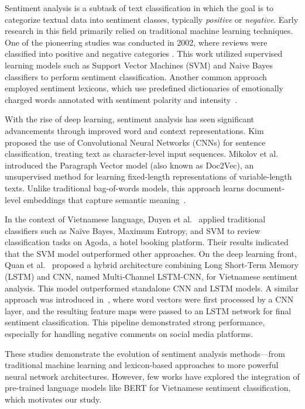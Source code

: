 \documentclass[11pt]{article}
\begin{document}
Sentiment analysis is a subtask of text classification in which the goal is to categorize textual data into sentiment classes, typically \textit{positive} or \textit{negative}. Early research in this field primarily relied on traditional machine learning techniques. One of the pioneering studies was conducted in 2002, where reviews were classified into positive and negative categories \cite{pang-etal-2002-thumbs}. This work utilized supervised learning models such as Support Vector Machines (SVM) \cite{article} and Naive Bayes classifiers \cite{dey2016sentiment} to perform sentiment classification. Another common approach employed sentiment lexicons, which use predefined dictionaries of emotionally charged words annotated with sentiment polarity and intensity~\cite{taboada2011lexicon}.

With the rise of deep learning, sentiment analysis has seen significant advancements through improved word and context representations. Kim~\cite{kim2014convolutional} proposed the use of Convolutional Neural Networks (CNNs) for sentence classification, treating text as character-level input sequences. Mikolov et al.~\cite{mikolov2013distributed} introduced the Paragraph Vector model (also known as Doc2Vec), an unsupervised method for learning fixed-length representations of variable-length texts. Unlike traditional bag-of-words models, this approach learns document-level embeddings that capture semantic meaning~\cite{le2014distributed}.

In the context of Vietnamese language, Duyen et al.~\cite{duyen2012opinion} applied traditional classifiers such as Na\"{i}ve Bayes, Maximum Entropy, and SVM to review classification tasks on Agoda, a hotel booking platform. Their results indicated that the SVM model outperformed other approaches. On the deep learning front, Quan et al.~\cite{quan2019multi} proposed a hybrid architecture combining Long Short-Term Memory (LSTM) and CNN, named Multi-Channel LSTM-CNN, for Vietnamese sentiment analysis. This model outperformed standalone CNN and LSTM models. A similar approach was introduced in~\cite{vo2019deep}, where word vectors were first processed by a CNN layer, and the resulting feature maps were passed to an LSTM network for final sentiment classification. This pipeline demonstrated strong performance, especially for handling negative comments on social media platforms.

These studies demonstrate the evolution of sentiment analysis methods—from traditional machine learning and lexicon-based approaches to more powerful neural network architectures. However, few works have explored the integration of pre-trained language models like BERT for Vietnamese sentiment classification, which motivates our study.
\end{document}
